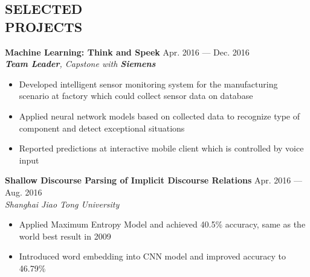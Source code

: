 \documentclass[margin,line,10pt]{res}
\begin{document}
\begin{resume}
\section{SELECTED\\PROJECTS}
{
\small
{\bf Machine Learning: Think and Speek} \hfill Apr. 2016 --- Dec. 2016\\
{\it \textbf{Team Leader}, Capstone with {\bf Siemens}}
}
\begin{itemize}
\setlength{\itemsep}{0pt}
\setlength{\parskip}{0pt}
\setlength{\parsep}{0pt}
\item {\small Developed intelligent sensor monitoring system for the manufacturing scenario at factory which could collect sensor data on database}
\item {\small Applied neural network models based on collected data to recognize type of component and detect exceptional situations}
\item {\small Reported predictions at interactive mobile client which is controlled by voice input}
\end{itemize}
{
\small
{\bf Shallow Discourse Parsing of Implicit Discourse Relations} \hfill Apr. 2016 ---  Aug. 2016\\
{\it Shanghai Jiao Tong University}
}
\begin{itemize}
\setlength{\itemsep}{0pt}
\setlength{\parskip}{0pt}
\setlength{\parsep}{0pt}
\item {\small Applied Maximum Entropy Model and achieved 40.5\% accuracy, same as the world best result in 2009}
\item {\small Introduced word embedding into CNN model and improved accuracy to 46.79\%}
\end{itemize}


\end{resume}
\end{document}
